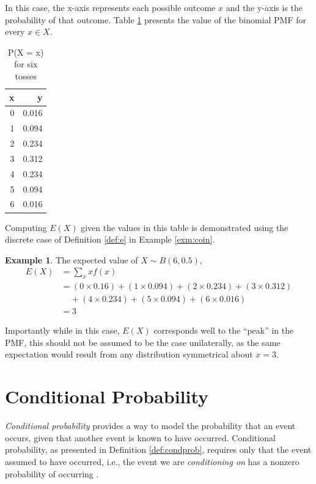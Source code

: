 \documentclass[
  12pt,
  twoside]{book}
\theoremstyle{definition}
\theoremstyle{definition}
\newtheorem{example}{Example}[chapter]
\theoremstyle{definition}
\theoremstyle{remark}
\begin{document}
In this case, the x-axis represents each possible outcome \(x\) and the y-axis is the probability of that outcome. Table \ref{tab:bino} presents the value of the binomial PMF for every \(x \in X\).

\begin{table}[!h]

\caption{\label{tab:bino}P(X = x) for six tosses}
\centering
\begin{tabular}[t]{rr}
\toprule
x & y\\
\midrule
0 & 0.016\\
1 & 0.094\\
2 & 0.234\\
3 & 0.312\\
4 & 0.234\\
5 & 0.094\\
6 & 0.016\\
\bottomrule
\end{tabular}
\end{table}

Computing \(E(X)\) given the values in this table is demonstrated using the discrete case of Definition \ref{def:e} in Example \ref{exm:coin}.

\begin{example}
\protect\hypertarget{exm:coin}{}{\label{exm:coin} }The expected value of \(X \sim B(6, 0.5)\),
\[\begin{split}
E(X) & = \sum_{x}xf(x) \\
  & =  (0 \times 0.16)+(1 \times 0.094)+(2 \times 0.234)+(3 \times 0.312)\\
  & \;\;\;\; +(4 \times 0.234)+(5 \times 0.094)+(6 \times 0.016)\\
  & = 3
\end{split}\]
\end{example}

Importantly while in this case, \(E(X)\) corresponds well to the ``peak'' in the PMF, this should not be assumed to be the case unilaterally, as the same expectation would result from any distribution symmetrical about \(x=3\).

\hypertarget{conditional-probability}{%
\section{Conditional Probability}\label{conditional-probability}}

\emph{Conditional probability} provides a way to model the probability that an event occurs, given that another event is known to have occurred.
Conditional probability, as presented in Definition \ref{def:condprob}, requires only that the event assumed to have occurred, i.e., the event we are \emph{conditioning on} has a nonzero probability of occurring \citep[  3.5]{Wasserman2004}.
\end{document}
